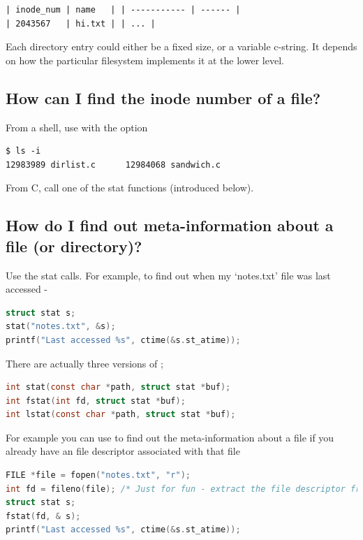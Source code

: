 \begin{lstlisting}
| inode_num | name   | | ----------- | ------ | 
| 2043567   | hi.txt | | ... |
\end{lstlisting}

Each directory entry could either be a fixed size, or a variable c-string. It depends on how the particular filesystem implements it at the lower level.

\subsection{How can I find the inode number of a file?}\label{how-can-i-find-the-inode-number-of-a-file}

From a shell, use  with the  option

\begin{lstlisting}
$ ls -i
12983989 dirlist.c      12984068 sandwich.c
\end{lstlisting}

From C, call one of the stat functions (introduced below).

\subsection{How do I find out meta-information about a file (or directory)?}\label{how-do-i-find-out-meta-information-about-a-file-or-directory}

Use the stat calls. For example, to find out when my `notes.txt' file was last accessed -

\begin{lstlisting}[language=C]
struct stat s;
stat("notes.txt", &s);
printf("Last accessed %s", ctime(&s.st_atime));
\end{lstlisting}

There are actually three versions of ;

\begin{lstlisting}[language=C]
int stat(const char *path, struct stat *buf);
int fstat(int fd, struct stat *buf);
int lstat(const char *path, struct stat *buf);
\end{lstlisting}

For example you can use  to find out the meta-information about a file if you already have an file descriptor associated with that file

\begin{lstlisting}[language=C]
FILE *file = fopen("notes.txt", "r");
int fd = fileno(file); /* Just for fun - extract the file descriptor from a C FILE struct */
struct stat s;
fstat(fd, & s);
printf("Last accessed %s", ctime(&s.st_atime));
\end{lstlisting}

